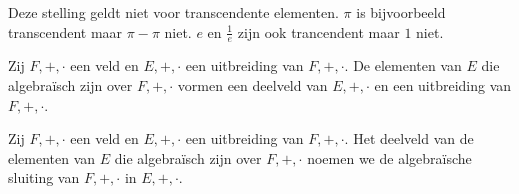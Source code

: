 \documentclass[main.tex]{subfiles}
\begin{document}
\begin{opm}
  Deze stelling geldt niet voor transcendente elementen.
  $\pi$ is bijvoorbeeld transcendent maar $\pi-\pi$ niet.
  $e$ en $\frac{1}{e}$ zijn ook trancendent maar $1$ niet.
\end{opm}

\begin{gev}
  Zij $F,+,\cdot$ een veld en $E,+,\cdot$ een uitbreiding van $F,+,\cdot$.
  De elementen van $E$ die algebra\"isch zijn over $F,+,\cdot$ vormen een deelveld van $E,+,\cdot$ en een uitbreiding van $F,+,\cdot$.
\end{gev}

\begin{de}
  Zij $F,+,\cdot$ een veld en $E,+,\cdot$ een uitbreiding van $F,+,\cdot$.
  Het deelveld van de elementen van $E$ die algebra\"isch zijn over $F,+,\cdot$ noemen we de algebra\"ische sluiting van $F,+,\cdot$ in $E,+,\cdot$.
\end{de}
\end{document}
